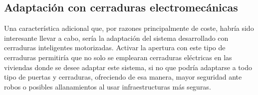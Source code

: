 \subsection{Adaptación con cerraduras electromecánicas}
Una característica adicional que, por razones principalmente de coste, habría sido interesante llevar a cabo, sería la adaptación del sistema desarrollado con cerraduras inteligentes motorizadas. Activar la apertura con este tipo de cerraduras permitiría que no solo se emplearan cerraduras eléctricas en las viviendas donde se desee adaptar este sistema, si no que podría adaptarse a todo tipo de puertas y cerraduras, ofreciendo de esa manera, mayor seguridad ante robos o posibles allanamientos al usar infraestructuras más seguras.


